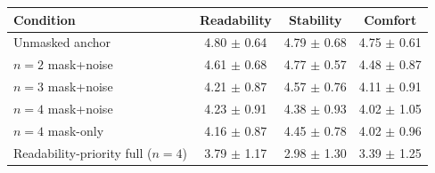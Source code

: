\begin{tabular}{lccc}
\toprule
Condition & Readability & Stability & Comfort \\
\midrule
Unmasked anchor & 4.80 $\pm$ 0.64 & 4.79 $\pm$ 0.68 & 4.75 $\pm$ 0.61 \\
$n{=}2$ mask+noise & 4.61 $\pm$ 0.68 & 4.77 $\pm$ 0.57 & 4.48 $\pm$ 0.87 \\
$n{=}3$ mask+noise & 4.21 $\pm$ 0.87 & 4.57 $\pm$ 0.76 & 4.11 $\pm$ 0.91 \\
$n{=}4$ mask+noise & 4.23 $\pm$ 0.91 & 4.38 $\pm$ 0.93 & 4.02 $\pm$ 1.05 \\
$n{=}4$ mask-only & 4.16 $\pm$ 0.87 & 4.45 $\pm$ 0.78 & 4.02 $\pm$ 0.96 \\
Readability-priority full ($n{=}4$) & 3.79 $\pm$ 1.17 & 2.98 $\pm$ 1.30 & 3.39 $\pm$ 1.25 \\
\bottomrule
\end{tabular}
